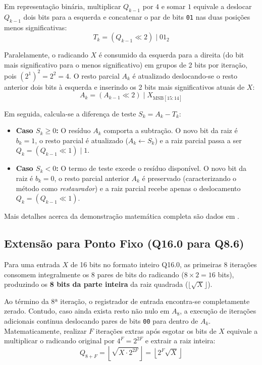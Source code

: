 \documentclass[conference]{IEEEtran}
\begin{document}
Em representação binária, multiplicar $Q_{k-1}$ por $4$ e somar $1$ equivale a deslocar $Q_{k-1}$ dois bits para a esquerda e concatenar o par de bits \texttt{01} nas duas posições menos significativas:
\begin{equation}
	T_k = (Q_{k-1} \ll 2) \mid 01_2
	\label{eq:concatenacao}
\end{equation}

Paralelamente, o radicando $X$ é consumido da esquerda para a direita (do bit mais significativo para o menos significativo) em grupos de 2 bits por iteração, pois $(2^1)^2 = 2^2 = 4$. O resto parcial $A_k$ é atualizado deslocando-se o resto anterior dois bits à esquerda e inserindo os 2 bits mais significativos atuais de $X$:
\begin{equation}
	A_k = (A_{k-1} \ll 2) \mid X_{\text{MSB}[15:14]}
	\label{eq:resto}
\end{equation}

Em seguida, calcula-se a diferença de teste $S_k = A_k - T_k$:
\begin{itemize}
	\item \textbf{Caso $S_k \ge 0$:} O resíduo $A_k$ comporta a subtração. O novo bit da raiz é $b_k = 1$, o resto parcial é atualizado ($A_k \leftarrow S_k$) e a raiz parcial passa a ser $Q_k = (Q_{k-1} \ll 1) \mid 1$.
	\item \textbf{Caso $S_k < 0$:} O termo de teste excede o resíduo disponível. O novo bit da raiz é $b_k = 0$, o resto parcial anterior $A_k$ é preservado (caracterizando o método como \textit{restaurador}) e a raiz parcial recebe apenas o deslocamento $Q_k = (Q_{k-1} \ll 1)$. 
\end{itemize}

Mais detalhes acerca da demonstração matemática completa são dados em \cite{wiki_sqrt}.

\subsection{Extensão para Ponto Fixo (Q16.0 para Q8.6)}
Para uma entrada $X$ de 16 bits no formato inteiro Q16.0, as primeiras $8$ iterações consomem integralmente os $8$ pares de bits do radicando ($8 \times 2 = 16$ bits), produzindo os \textbf{8 bits da parte inteira} da raiz quadrada ($\lfloor\sqrt{X}\rfloor$).

Ao término da 8ª iteração, o registrador de entrada encontra-se completamente zerado. Contudo, caso ainda exista resto não nulo em $A_8$, a execução de iterações adicionais continua deslocando pares de bits \texttt{00} para dentro de $A_k$. Matematicamente, realizar $F$ iterações extras após esgotar os bits de $X$ equivale a multiplicar o radicando original por $4^F = 2^{2F}$ e extrair a raiz inteira:
\begin{equation}
	Q_{8+F} = \left\lfloor \sqrt{X \cdot 2^{2F}} \right\rfloor = \left\lfloor 2^F \sqrt{X} \right\rfloor
	\label{eq:escala}
\end{equation}
\end{document}
